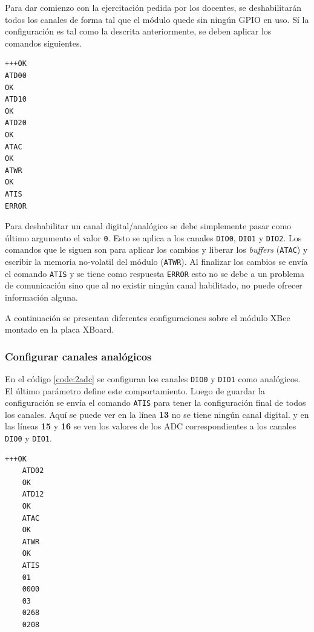 \documentclass[11pt,oneside,spanish,a4paper]{article}
\begin{document}
Para dar comienzo con la ejercitación pedida por los docentes, se
deshabilitarán todos los canales de forma tal que el módulo quede sin
ningún GPIO en uso. Sí la configuración es tal como la descrita
anteriormente, se deben aplicar los comandos siguientes.

\begin{multicols}{2}
\begin{lstlisting}[emph={+++,ATIS,ATD00,ATD10,ATD20,ATWR,ATAC}, emphstyle={\color{blue}}]
+++OK
ATD00
OK
ATD10
OK
ATD20
OK
ATAC
OK
ATWR
OK
ATIS
ERROR
\end{lstlisting}

Para deshabilitar un canal digital/analógico se debe simplemente pasar
como último argumento el valor \texttt{0}. Esto se aplica a los
canales \texttt{DIO0}, \texttt{DIO1} y \texttt{DIO2}. Los comandos que
le siguen son para aplicar los cambios y liberar los \textsl{buffers}
(\texttt{ATAC}) y  escribir la
memoria no-volatil del módulo (\texttt{ATWR}). Al finalizar los
cambios se envía el comando \texttt{ATIS} y se tiene como respuesta
\texttt{ERROR} esto no se debe a un problema de comunicación sino que
al no existir ningún canal habilitado, no puede ofrecer información
alguna. 
\end{multicols}

A continuación se presentan diferentes configuraciones sobre el módulo
XBee montado en la placa XBoard.

\subsubsection{Configurar canales analógicos}

En el código \ref{code:2adc} se configuran los canales \texttt{DIO0}
y \texttt{DIO1} como analógicos. El último parámetro define este
comportamiento. Luego de guardar la configuración se envía el comando
\texttt{ATIS} para tener la configuración final de todos los
canales. Aquí se puede ver en la línea \textbf{13} no se tiene ningún
canal digital. y en las líneas \textbf{15} y \textbf{16} se ven los
valores de los ADC correspondientes a los canales \texttt{DIO0} y
\texttt{DIO1}.

\begin{lstlisting}[emph={+++,ATIS,ATD02,ATD12,ATWR,ATAC},
    emphstyle={\color{blue}},caption={Configuración de dos canales
      analógicos.},label=code:2adc]
    +++OK
    ATD02
    OK
    ATD12
    OK
    ATAC
    OK
    ATWR
    OK
    ATIS
    01
    0000
    03
    0268
    0208
\end{lstlisting}  
\end{document}

